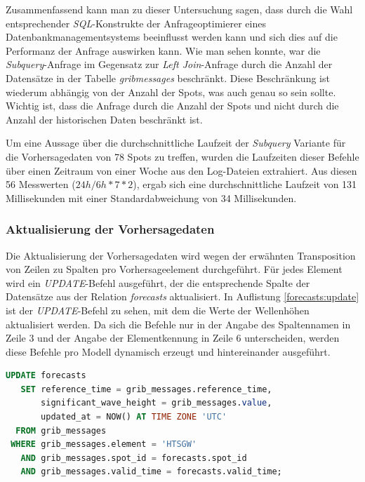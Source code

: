 Zusammenfassend kann man zu dieser Untersuchung sagen, dass durch die
Wahl entsprechender \textit{SQL}-Konstrukte der Anfrageoptimierer
eines Datenbankmanagementsystems beeinflusst werden kann und sich dies
auf die Performanz der Anfrage auswirken kann. Wie man sehen konnte,
war die \textit{Subquery}-Anfrage im Gegensatz zur \textit{Left
  Join}-Anfrage durch die Anzahl der Datensätze in der Tabelle
\textit{grib\textunderscore messages} beschränkt. Diese Beschränkung
ist wiederum abhängig von der Anzahl der Spots, was auch genau so sein
sollte. Wichtig ist, dass die Anfrage durch die Anzahl der Spots und
nicht durch die Anzahl der historischen Daten beschränkt ist.

Um eine Aussage über die durchschnittliche Laufzeit der
\textit{Subquery} Variante für die Vorhersagedaten von 78 Spots zu
treffen, wurden die Laufzeiten dieser Befehle über einen Zeitraum von
einer Woche aus den Log-Dateien extrahiert. Aus diesen 56 Messwerten
($24h/6h * 7 * 2$), ergab sich eine durchschnittliche Laufzeit von 131
Millisekunden mit einer Standardabweichung von 34 Millisekunden.

\subsubsection{Aktualisierung der Vorhersagedaten}
Die Aktualisierung der Vorhersagedaten wird wegen der erwähnten
Transposition von Zeilen zu Spalten pro Vorhersageelement
durchgeführt. Für jedes Element wird ein \textit{UPDATE}-Befehl
ausgeführt, der die entsprechende Spalte der Datensätze aus der
Relation \textit{forecasts} aktualisiert. In Auflistung
\ref{forecasts:update} ist der \textit{UPDATE}-Befehl zu sehen, mit
dem die Werte der Wellenhöhen aktualisiert werden. Da sich die Befehle
nur in der Angabe des Spaltennamen in Zeile 3 und der Angabe der
Elementkennung in Zeile 6 unterscheiden, werden diese Befehle pro
Modell dynamisch erzeugt und hintereinander ausgeführt.

\begin{lstlisting}[captionpos=b, caption=Aktualisierung der Wellenhöhe, label=forecasts:update, language=SQL]
UPDATE forecasts
   SET reference_time = grib_messages.reference_time,
       significant_wave_height = grib_messages.value,
       updated_at = NOW() AT TIME ZONE 'UTC'
  FROM grib_messages
 WHERE grib_messages.element = 'HTSGW'
   AND grib_messages.spot_id = forecasts.spot_id
   AND grib_messages.valid_time = forecasts.valid_time;
\end{lstlisting}

